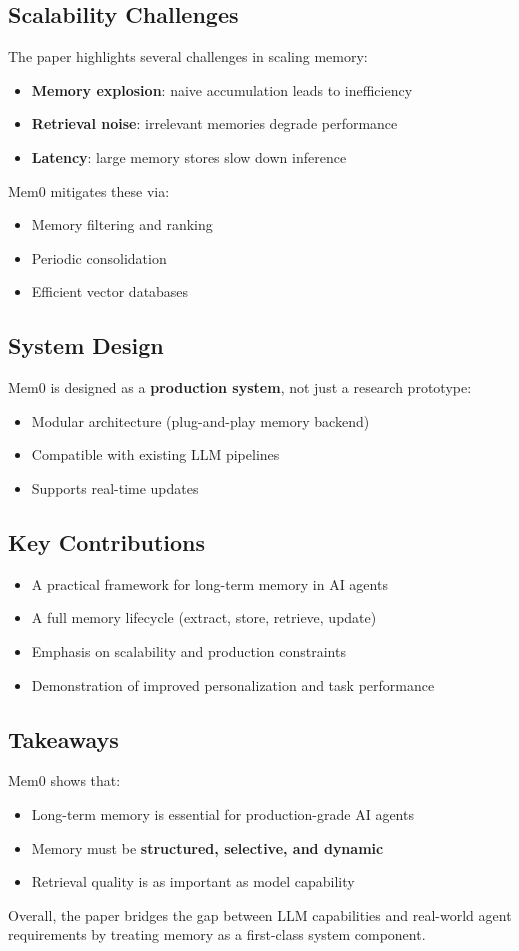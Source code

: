 \documentclass[12pt]{article}
\begin{document}
\subsection{Scalability Challenges}
The paper highlights several challenges in scaling memory:
\begin{itemize}
		\item \textbf{Memory explosion}: naive accumulation leads to inefficiency
		\item \textbf{Retrieval noise}: irrelevant memories degrade performance
		\item \textbf{Latency}: large memory stores slow down inference
\end{itemize}

Mem0 mitigates these via:
\begin{itemize}
		\item Memory filtering and ranking
		\item Periodic consolidation
		\item Efficient vector databases
\end{itemize}

\subsection{System Design}
Mem0 is designed as a \textbf{production system}, not just a research prototype:
\begin{itemize}
		\item Modular architecture (plug-and-play memory backend)
		\item Compatible with existing LLM pipelines
		\item Supports real-time updates
\end{itemize}

\subsection{Key Contributions}
\begin{itemize}
		\item A practical framework for long-term memory in AI agents
		\item A full memory lifecycle (extract, store, retrieve, update)
		\item Emphasis on scalability and production constraints
		\item Demonstration of improved personalization and task performance
\end{itemize}

\subsection{Takeaways}
Mem0 shows that:
\begin{itemize}
		\item Long-term memory is essential for production-grade AI agents
		\item Memory must be \textbf{structured, selective, and dynamic}
		\item Retrieval quality is as important as model capability
\end{itemize}

Overall, the paper bridges the gap between LLM capabilities and real-world agent requirements by treating
memory as a first-class system component.
\end{document}
